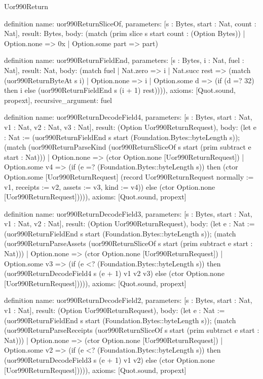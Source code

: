 \begin{lexlean}{Uor990Return}
\begin{semanticmodule}
definition{
  name: uor990ReturnSliceOf,
  parameters: [s : Bytes, start : Nat, count : Nat],
  result: Bytes,
  body: (match (prim slice s start count : (Option Bytes))
    | Option.none => 0x
    | Option.some part => part)
}

definition{
  name: uor990ReturnFieldEnd,
  parameters: [s : Bytes, i : Nat, fuel : Nat],
  result: Nat,
  body: (match fuel
    | Nat.zero => i
    | Nat.succ rest => (match (uor990ReturnByteAt s i)
      | Option.none => i
      | Option.some d => (if (d =? 32) then i else (uor990ReturnFieldEnd s (i + 1) rest)))),
  axioms: [Quot.sound, propext],
  recursive_argument: fuel
}

definition{
  name: uor990ReturnDecodeField4,
  parameters: [s : Bytes, start : Nat, v1 : Nat, v2 : Nat, v3 : Nat],
  result: (Option Uor990ReturnRequest),
  body: (let e : Nat := (uor990ReturnFieldEnd s start (Foundation.Bytes::byteLength s)); (match (uor990ReturnParseKind (uor990ReturnSliceOf s start (prim subtract e start : Nat)))
    | Option.none => (ctor Option.none [Uor990ReturnRequest])
    | Option.some v4 => (if (e =? (Foundation.Bytes::byteLength s)) then (ctor Option.some [Uor990ReturnRequest] (record Uor990ReturnRequest {normally := v1, receipts := v2, assets := v3, kind := v4})) else (ctor Option.none [Uor990ReturnRequest])))),
  axioms: [Quot.sound, propext]
}

definition{
  name: uor990ReturnDecodeField3,
  parameters: [s : Bytes, start : Nat, v1 : Nat, v2 : Nat],
  result: (Option Uor990ReturnRequest),
  body: (let e : Nat := (uor990ReturnFieldEnd s start (Foundation.Bytes::byteLength s)); (match (uor990ReturnParseAssets (uor990ReturnSliceOf s start (prim subtract e start : Nat)))
    | Option.none => (ctor Option.none [Uor990ReturnRequest])
    | Option.some v3 => (if (e <? (Foundation.Bytes::byteLength s)) then (uor990ReturnDecodeField4 s (e + 1) v1 v2 v3) else (ctor Option.none [Uor990ReturnRequest])))),
  axioms: [Quot.sound, propext]
}

definition{
  name: uor990ReturnDecodeField2,
  parameters: [s : Bytes, start : Nat, v1 : Nat],
  result: (Option Uor990ReturnRequest),
  body: (let e : Nat := (uor990ReturnFieldEnd s start (Foundation.Bytes::byteLength s)); (match (uor990ReturnParseReceipts (uor990ReturnSliceOf s start (prim subtract e start : Nat)))
    | Option.none => (ctor Option.none [Uor990ReturnRequest])
    | Option.some v2 => (if (e <? (Foundation.Bytes::byteLength s)) then (uor990ReturnDecodeField3 s (e + 1) v1 v2) else (ctor Option.none [Uor990ReturnRequest])))),
  axioms: [Quot.sound, propext]
}


\end{semanticmodule}
\end{lexlean}

